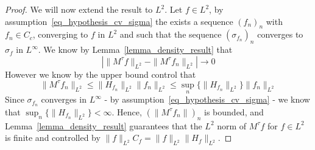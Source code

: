 \begin{proof}
 We will now extend the result to $L^2$. Let $f\in L^2$, by assumption~\eqref{eq_hypothesis_cv_sigma} the exists a sequence $(f_n)_n$ with $f_n\in C_c$, converging to $f$ in $L^2$ and such that the sequence $(\sigma_{f_n})_n$ converges to $\sigma_f$ in $L^\infty$. We know by Lemma~\ref{lemma_density_result} that 
 \begin{equation}
     \left|\|M^\tau f\|_{L^2} - \|M^\tau f_n \|_{L^2} \right| \rightarrow 0
 \end{equation}
 However we know by the upper bound control that
 \begin{equation}
     \|M^\tau f_n\|_{L^2} \leqslant \|H_{f_n}\|_{L^2}\|f_n\|_{L^2} \leqslant \sup_n \{\|H_{f_n}\|_{L^2}\}\|f_n\|_{L^2}
 \end{equation}
 Since $\sigma_{f_n}$ converges in $L^\infty$ - by assumption~\eqref{eq_hypothesis_cv_sigma} - we know that $\sup_n \{\|H_{f_n}\|_{L^2}\}< \infty$. Hence, $(\|M^\tau f_n\|)_n$ is bounded, and Lemma~\ref{lemma_density_result} guarantees that the $L^2$ norm of $M^\tau f$ for $f\in L^2$ is finite and controlled by $\|f\|_{L^2}C_f=\|f\|_{L^2}\|H_f\|_{L^2}$.
 
\end{proof}

